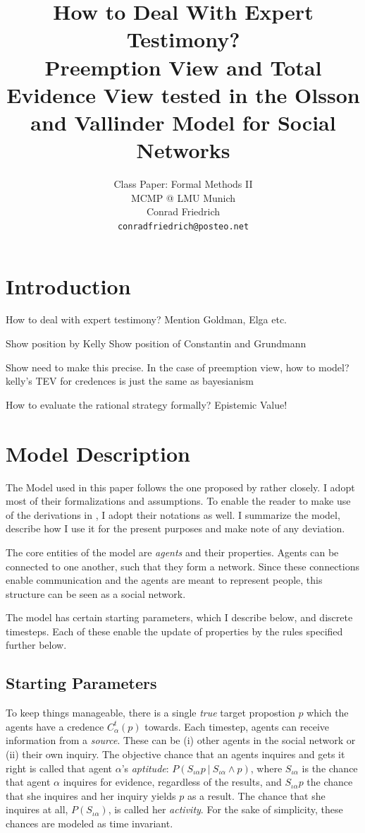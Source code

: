 \documentclass[11pt, a4paper]{article}
\title{\textbf{How to Deal With Expert Testimony?} \\Preemption View and Total Evidence View tested in the Olsson and Vallinder Model for Social Networks }
\author{Class Paper: Formal Methods II \\ MCMP @ LMU Munich \\ Conrad Friedrich \\ \texttt{conradfriedrich@posteo.net}}
\newcommand\given[1][]{\:#1\vert\:}
\renewcommand{\i}[1]{\emph{#1}}
\begin{document}
\maketitle
\abstract{}
\section{Introduction}
How to deal with expert testimony? Mention Goldman, Elga etc.

Show position by Kelly
Show position of Constantin and Grundmann

Show need to make this precise. In the case of preemption view, how to model? 
kelly's TEV for credences is just the same as bayesianism 

How to evaluate the rational strategy formally?
Epistemic Value!

\section{Model Description}

The Model used in this paper follows the one proposed by \textcite{Olsson2013} rather closely. I adopt most of their formalizations and assumptions. To enable the reader to make use of the derivations in \textcite{Angere2010}, I adopt their notations as well. I summarize the model, describe how I use it for the present purposes and make note of any deviation.

The core entities of the model are \i{agents} and their properties. Agents can be connected to one another, such that they form a network. Since these connections enable communication and the agents are meant to represent people, this structure can be seen as a social network.

The model has certain starting parameters, which I describe below, and discrete timesteps. Each of these enable the update of properties by the rules specified further below.

\subsection{Starting Parameters}

To keep things manageable, there is a single \i{true} target propostion $p$ which the agents have a credence $C^t_\alpha(p)$ towards. Each timestep, agents can receive information from a \i{source}. These can be (i) other agents in the social network or (ii) their own inquiry. The objective chance that an agents inquires and gets it right is called that agent $\alpha$'s \i{aptitude}: $P(S_{\iota \alpha}p \given S_{\iota \alpha} \land p)$, where $S_{\iota \alpha}$ is the chance that agent $\alpha$ inquires for evidence, regardless of the results, and $S_{\iota \alpha} p$ the chance that she inquires and her inquiry yields $p$ as a result. The chance that she inquires at all, $P(S_{\iota \alpha})$, is called her \i{activity}. For the sake of simplicity, these chances are modeled as time invariant.
\end{document}
